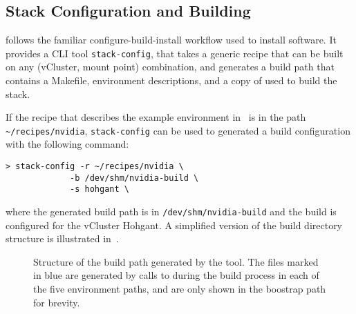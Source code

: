\subsection{Stack Configuration and Building}

\stackinator follows the familiar configure-build-install workflow used to install software.
It provides a CLI tool \lstinline{stack-config}, that takes a generic recipe that can be built on any (vCluster, mount point) combination, and generates a build path that contains a Makefile, \spack environment descriptions, and a copy of \spack used to build the stack.

If the recipe that describes the example environment in~ is in the path \lstinline{~/recipes/nvidia}, \lstinline{stack-config} can be used to generated a build configuration with the following command:
\begin{lstlisting}
> stack-config -r ~/recipes/nvidia \
             -b /dev/shm/nvidia-build \
             -s hohgant \
\end{lstlisting}
where the generated build path is in \lstinline{/dev/shm/nvidia-build} and the build is configured for the vCluster Hohgant.
A simplified version of the build directory structure is illustrated in~.

\begin{figure}[htp!]
    
    \caption{Structure of the build path generated by the \stackinator tool. The files marked in blue are generated by calls to \spack during the build process in each of the five environment paths, and are only shown in the boostrap path for brevity.}
    \label{fig:build-tree}
\end{figure}

